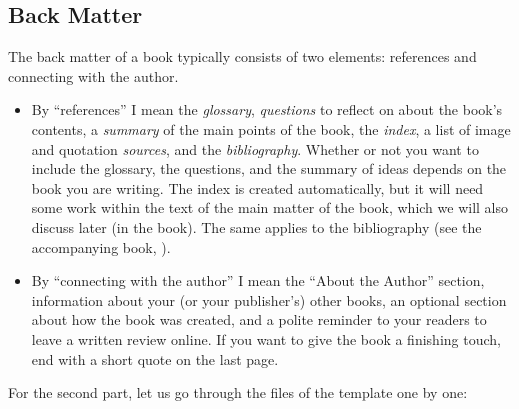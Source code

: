 \subsection{Back Matter}\label{backmatter:sec}

The back matter of a book typically consists of two elements: references and connecting with the author.

\begin{itemize}
    \item  By ``references'' I mean the \textit{glossary}, \textit{questions} to reflect on about the book's contents, a \textit{summary} of the main points of the book, the \textit{index}, a list of image and quotation \textit{sources}, and the \textit{bibliography}. Whether or not you want to include the glossary, the questions, and the summary of ideas depends on the book you are writing. The index is created automatically, but it will need some work within the text of the main matter of the book, which we will also discuss later (in the book). The same applies to the bibliography (see the accompanying book, ).
    
    \item By ``connecting with the author'' I mean the ``About the Author'' section, information about your (or your publisher's) other books, an optional section about how the book was created, and a polite reminder to your readers to leave a written review online. If you want to give the book a finishing touch, end with a short quote on the last page. 
\end{itemize}

For the second part, let us go through the files of the template one by one:

